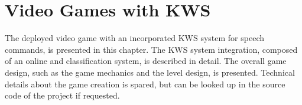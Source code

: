 
\chapter{Video Games with KWS}\label{sec:game}
The deployed video game with an incorporated KWS system for speech commands, is presented in this chapter.
The KWS system integration, composed of an online and classification system, is described in detail.
The overall game design, such as the game mechanics and the level design, is presented.
Technical details about the game creation is spared, but can be looked up in the source code of the project \cite{KWSGame} if requested.



